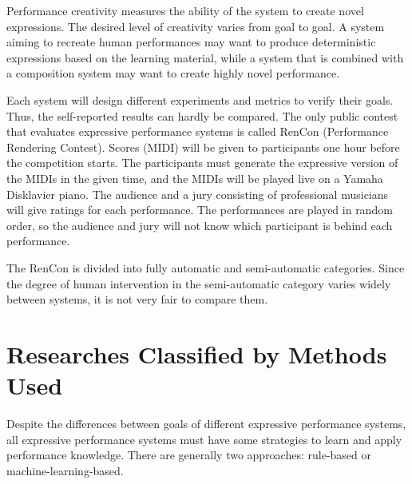 Performance creativity measures the ability of the system to create novel expressions. The desired level of creativity varies from goal to goal. A system aiming to recreate human performances may want to produce deterministic expressions based on the learning material, while a system that is combined with a composition system may want to create highly novel performance. 


Each system will design different experiments and metrics to verify their goals. Thus, the self-reported results can hardly be compared. The only public contest that evaluates expressive performance systems is called RenCon (Performance Rendering Contest)\cite{RenCon}. Scores (MIDI) will be given to participants one hour before the competition starts. The participants must generate the expressive version of the MIDIs in the given time, and the MIDIs will be played live on a Yamaha Disklavier piano. The audience and a jury consisting of professional musicians will give ratings for each performance. The performances are played in random order, so the audience and jury will not know which participant is behind each performance.

The RenCon is divided into fully automatic and semi-automatic categories. Since the degree of human intervention in the semi-automatic category varies widely between systems, it is not very fair to compare them.



\section{Researches Classified by Methods Used}
Despite the differences between goals of different expressive performance systems, all expressive performance systems must have some strategies to learn and apply performance knowledge. There are generally two approaches: rule-based or machine-learning-based.

